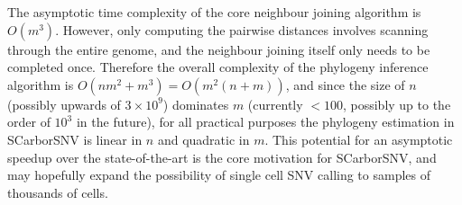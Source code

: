 \documentclass[../../main.tex]{subfiles}
\begin{document}
The asymptotic time complexity of the core neighbour joining algorithm is $O(m^3)$.
However, only computing the pairwise distances involves scanning through the entire genome, and the neighbour joining itself only needs to be completed once.
Therefore the overall complexity of the phylogeny inference algorithm is $O(nm^2 + m^3) = O(m^2(n+m))$, and since the size of $n$ (possibly upwards of $3\times10^9$) dominates $m$ (currently $<100$, possibly up to the order of $10^3$ in the future), for all practical purposes the phylogeny estimation in SCarborSNV is linear in $n$ and quadratic in $m$.
This potential for an asymptotic speedup over the state-of-the-art is the core motivation for SCarborSNV, and may hopefully expand the possibility of single cell SNV calling to samples of thousands of cells.
\end{document}
